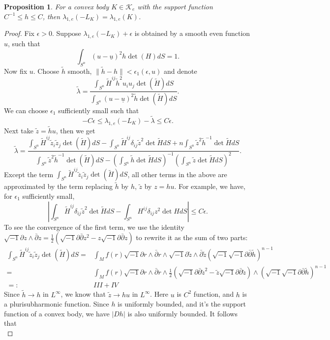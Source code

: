 \documentclass[reqno]{amsart}
\theoremstyle{remark}
\def\cK{{\mathcal K}}
\theoremstyle{plain}
\newtheorem{prop}[thm]{Proposition}
\newcommand{\ddc}{\sqrt{-1}\partial\bar\partial}
\begin{document}
\begin{prop}
    For a convex body $K\in \cK_e$ with the support function $C^{-1}\leq h\leq C$, then $\lambda_{1, e}(-L_K)=\lambda_{1, e}(K)$. 
\end{prop}
\begin{proof}
Fix $\epsilon>0$.
    Suppose $\lambda_{1, e}(-L_K)+\epsilon$ is obtained by a smooth even function $u$, such that 
    \[
    \int_{S^n}{(u-\underline u)^2} h\det(H)dS=1.
    \]
    Now fix $u$. Choose $\tilde h$ smooth, $\|\tilde h-h\|<\epsilon_{1}(\epsilon, u)$  and denote
    \[
    \tilde \lambda=\frac{\displaystyle \int_{S^n}\tilde H^{ij}\tilde h^2u_iu_j\det(\tilde H)dS}{\displaystyle\int_{S^n}{(u-\underline u)^2} \tilde h\det(\tilde H)dS}.
    \]
    We can choose $\epsilon_1$ sufficiently small such that 
    \[
   -C\epsilon\leq \lambda_{1, e}(-L_K)-\tilde \lambda \leq C\epsilon.
    \]
    Next take $\tilde{z}=\tilde h u$, then we get 
    \[
    \tilde \lambda=\frac{\displaystyle \int_{S^n}\tilde H^{ij}\tilde{z}_i\tilde{z}_j\det(\tilde H)dS-\int_{S^n}\tilde H^{ij}\delta_{ij}\tilde{z}^2 \det{\tilde H}dS+n\int_{S^n}\tilde{z}^2\tilde h^{-1}\det{\tilde H}dS}{\displaystyle\int_{S^n}\tilde{z}^2\tilde h^{-1}\det(\tilde H)dS-\left(\int_{S^n}\tilde h\det{\tilde H}dS\right)^{-1}\left(\int_{S^n}\tilde{z}\det{\tilde H}dS\right)^2}.
    \] 
Except the term $\displaystyle \int_{S^n}\tilde H^{ij}\tilde{z}_i\tilde{z}_j\det(\tilde H)dS$, all other terms in the above are approximated by the term replacing $\tilde h$ by $h$, $\tilde{z}$ by $z=hu$. For example, we have, for $\epsilon_1$ sufficiently small, 
\[
\left|\int_{S^n}\tilde H^{ij}\delta_{ij}\tilde{z}^2 \det{\tilde H}dS-\int_{S^n} H^{ij}\delta_{ij}z^2 \det{ H}dS\right|\leq C\epsilon.
\]
To see the convergence of the first term, we use the identity $\sqrt{-1}\partial z\wedge\bar{\partial}z=\frac{1}{2}(\ddc z^2-z\ddc z)$ to rewrite it as the sum of two parts:\[
\begin{aligned}
    \int_{S^n}\tilde{H}^{ij}\tilde{z}_i\tilde{z}_j\det(\tilde{H})dS=&\int_{M}f(r)\sqrt{-1}\partial r\wedge\bar{\partial}r\wedge \sqrt{-1}\partial \tilde{z}\wedge\bar{\partial}\tilde{z}(\sqrt{-1}\ddc \tilde{h})^{n-1}\\
    =&\int_{M}f(r)\sqrt{-1}\partial r\wedge\bar{\partial}r\wedge\frac{1}{2}(\ddc \tilde{z}^2-\tilde{z}\ddc \tilde{z})\wedge(\sqrt{-1}\ddc \tilde{h})^{n-1}\\
    =:&III+IV
\end{aligned}
\]
Since $\tilde{h}\rightarrow h$ in $L^\infty$, we know that $\tilde{z}\rightarrow hu$ in $L^\infty$. Here $u$ is $C^2$ function, and $h$ is a plurisubharmonic function. Since $h$ is uniformly bounded, and it's the support function of a convex body, we have $|D h|$ is also uniformly bounded. It follows that \[
\]
\end{proof}
\end{document}
